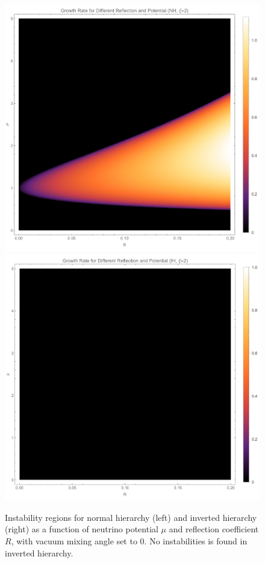 \begin{figure}[htbp]
    \includegraphics[width=\textwidth]{chapters/assets/halo/growth-rate-mu-refl-nh.jpg}
    \endminipage\hfill
    \includegraphics[width=\textwidth]{chapters/assets/halo/growth-rate-mu-refl-ih.jpg}
    \endminipage\hfill
    \caption{Instability regions for normal hierarchy (left) and inverted hierarchy (right) as a function of neutrino potential $\mu$ and reflection coefficient $R$, with vacuum mixing angle set to 0. No instabilities is found in inverted hierarchy.}
    \label{chap:halo-sec:line-sym-fig:instability-regions}
\end{figure}




